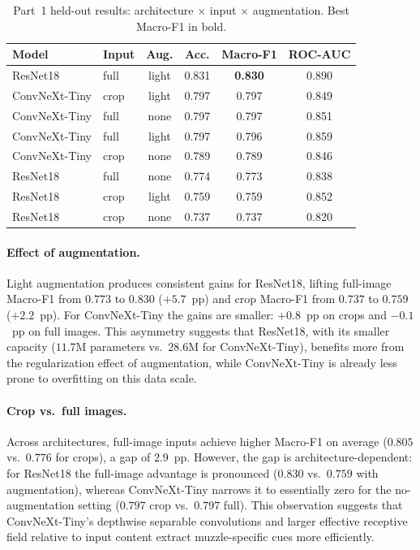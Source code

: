\documentclass[sigconf]{acmart}
\begin{document}
\begin{table}[t]
  \centering
  \caption{Part~1 held-out results: architecture $\times$ input $\times$
  augmentation. Best Macro-F1 in bold.}
  \label{tab:part1}
  \small
  \begin{tabular}{llcccc}
    \toprule
    Model & Input & Aug. & Acc. & Macro-F1 & ROC-AUC \\
    \midrule
    ResNet18 & full & light & 0.831 & \textbf{0.830} & 0.890 \\
    ConvNeXt-Tiny & crop & light & 0.797 & 0.797 & 0.849 \\
    ConvNeXt-Tiny & full & none & 0.797 & 0.797 & 0.851 \\
    ConvNeXt-Tiny & full & light & 0.797 & 0.796 & 0.859 \\
    ConvNeXt-Tiny & crop & none & 0.789 & 0.789 & 0.846 \\
    ResNet18 & full & none & 0.774 & 0.773 & 0.838 \\
    ResNet18 & crop & light & 0.759 & 0.759 & 0.852 \\
    ResNet18 & crop & none & 0.737 & 0.737 & 0.820 \\
    \bottomrule
  \end{tabular}
\end{table}

\paragraph{Effect of augmentation.}
Light augmentation produces consistent gains for ResNet18, lifting
full-image Macro-F1 from $0.773$ to $0.830$ ($+5.7$~pp) and crop Macro-F1
from $0.737$ to $0.759$ ($+2.2$~pp). For ConvNeXt-Tiny the gains are smaller:
$+0.8$~pp on crops and $-0.1$~pp on full images. This asymmetry suggests that
ResNet18, with its smaller capacity ($11.7$M parameters vs.\ $28.6$M for
ConvNeXt-Tiny), benefits more from the regularization effect of augmentation,
while ConvNeXt-Tiny is already less prone to overfitting on this data scale.

\paragraph{Crop vs.\ full images.}
Across architectures, full-image inputs achieve higher Macro-F1 on average
($0.805$ vs.\ $0.776$ for crops), a gap of $2.9$~pp. However, the gap is
architecture-dependent: for ResNet18 the full-image advantage is pronounced
($0.830$ vs.\ $0.759$ with augmentation), whereas ConvNeXt-Tiny narrows it to
essentially zero for the no-augmentation setting ($0.797$ crop vs.\ $0.797$
full). This observation suggests that ConvNeXt-Tiny's depthwise separable
convolutions and larger effective receptive field relative to input content
extract muzzle-specific cues more efficiently.
\end{document}
